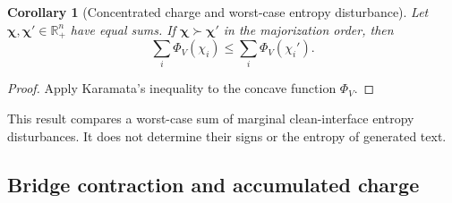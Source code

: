 \documentclass{article}
\newcommand{\1}{\mathbf 1}
\newtheorem{corollary}[theorem]{Corollary}
\theoremstyle{definition}
\begin{document}
\begin{corollary}[Concentrated charge and worst-case entropy disturbance]
\label{cor:charge-majorization}
Let $\boldsymbol\chi,\boldsymbol\chi'\in\mathbb R_+^n$ have equal sums. If
$\boldsymbol\chi\succ\boldsymbol\chi'$ in the majorization order, then
\begin{equation}
 \sum_i\Phi_V(\chi_i)
 \le
 \sum_i\Phi_V(\chi_i').
 \label{eq:charge-majorization-app}
\end{equation}
\end{corollary}

\begin{proof}
Apply Karamata's inequality to the concave function $\Phi_V$.
\end{proof}

This result compares a worst-case sum of marginal clean-interface entropy
disturbances. It does not determine their signs or the entropy of generated
text.

\subsection{Bridge contraction and accumulated charge}
\end{document}
